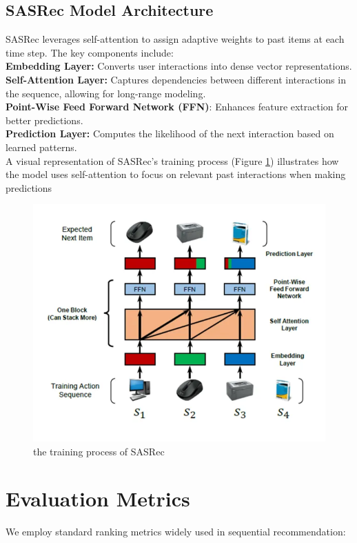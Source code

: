 \subsection{SASRec Model Architecture}
SASRec leverages self-attention to assign adaptive weights to past items at each time step. The key components include:\\
\textbf{ Embedding Layer:} Converts user interactions into dense vector representations. \\
\textbf{ Self-Attention Layer: }Captures dependencies between different interactions in the sequence, allowing for long-range modeling.\\
\textbf{ Point-Wise Feed Forward Network (FFN)}: Enhances feature extraction for better predictions.\\
\textbf{Prediction Layer:} Computes the likelihood of the next interaction based on learned patterns.\\
A visual representation of SASRec’s training process (Figure \ref{the_training_process_of_SASRec}) illustrates how the model uses self-attention to focus on relevant past interactions when making predictions
\begin{figure}[ht]
	\centering
	\includegraphics[width=0.6\linewidth]{Figures/sasrec.png}
	\caption{the training process of SASRec}
	\label{the_training_process_of_SASRec}	
\end{figure}
\section{Evaluation Metrics}
We employ standard ranking metrics widely used in sequential recommendation:

